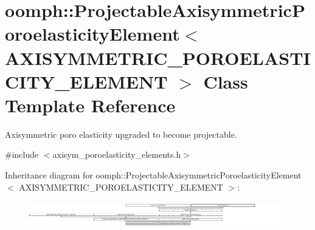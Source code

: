 \hypertarget{classoomph_1_1ProjectableAxisymmetricPoroelasticityElement}{}\section{oomph\+:\+:Projectable\+Axisymmetric\+Poroelasticity\+Element$<$ A\+X\+I\+S\+Y\+M\+M\+E\+T\+R\+I\+C\+\_\+\+P\+O\+R\+O\+E\+L\+A\+S\+T\+I\+C\+I\+T\+Y\+\_\+\+E\+L\+E\+M\+E\+NT $>$ Class Template Reference}
\label{classoomph_1_1ProjectableAxisymmetricPoroelasticityElement}


Axisymmetric poro elasticity upgraded to become projectable.  




{\ttfamily \#include $<$axisym\+\_\+poroelasticity\+\_\+elements.\+h$>$}

Inheritance diagram for oomph\+:\+:Projectable\+Axisymmetric\+Poroelasticity\+Element$<$ A\+X\+I\+S\+Y\+M\+M\+E\+T\+R\+I\+C\+\_\+\+P\+O\+R\+O\+E\+L\+A\+S\+T\+I\+C\+I\+T\+Y\+\_\+\+E\+L\+E\+M\+E\+NT $>$\+:\begin{figure}[H]
\begin{center}
\leavevmode
\includegraphics[height=1.132686cm]{classoomph_1_1ProjectableAxisymmetricPoroelasticityElement}
\end{center}
\end{figure}
